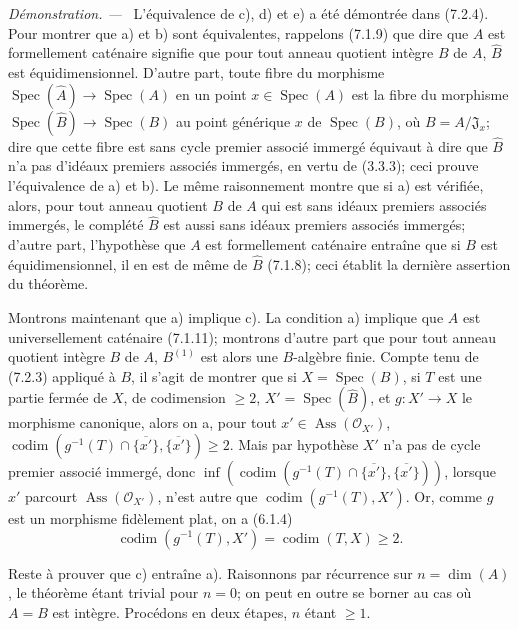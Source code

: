 \documentclass[10pt,oneside]{book}
\newcommand{\oldpage}[2][]{%
  \setcounter{footnote}{0}%
  \marginpar{\scriptsize\textbf{#1}~|~#2}\ignorespaces}
\newenvironment{proof}{%
  \par\medskip\noindent\textit{Démonstration. ---\ }}{\par}
\begin{document}
\begin{proof}
L'équivalence de c), d) et e) a été démontrée dans (7.2.4). Pour montrer
que a) et b) sont équivalentes, rappelons (7.1.9) que dire que $A$ est
formellement caténaire signifie que pour tout anneau quotient intègre $B$
de $A$, $\widehat B$ est équidimensionnel. D'autre part, toute fibre du
morphisme $\operatorname{Spec}(\widehat A)\to\operatorname{Spec}(A)$ en un
point $x\in\operatorname{Spec}(A)$ est la fibre du morphisme
$\operatorname{Spec}(\widehat B)\to\operatorname{Spec}(B)$ au point
générique $x$ de $\operatorname{Spec}(B)$, où
$B=A/\mathfrak J_x$; dire que cette fibre est sans cycle premier associé
immergé équivaut à dire que $\widehat B$ n'a pas d'idéaux premiers associés
immergés, en vertu de (3.3.3); ceci prouve l'équivalence de a) et b). Le
même raisonnement montre que si a) est vérifiée, alors, pour tout anneau
quotient $B$ de $A$ qui est sans idéaux premiers associés immergés, le
complété $\widehat B$ est aussi sans idéaux premiers associés immergés;
d'autre part, l'hypothèse que $A$ est formellement caténaire entraîne que
si $B$ est équidimensionnel, il en est de même de $\widehat B$ (7.1.8);
ceci établit la dernière assertion du théorème.

Montrons maintenant que a) implique c). La condition a) implique que $A$
est universellement caténaire (7.1.11); montrons d'autre part que pour tout
anneau quotient intègre $B$ de $A$, $B^{(1)}$ est alors une $B$-algèbre
finie. Compte tenu de (7.2.3) appliqué à $B$, il s'agit de montrer que si
$X=\operatorname{Spec}(B)$, si $T$ est une partie fermée de $X$, de
codimension $\geqslant2$, $X'=\operatorname{Spec}(\widehat B)$, et
$g:X'\to X$ le morphisme canonique, alors on a, pour tout
$x'\in\operatorname{Ass}(\mathscr O_{X'})$,
$\operatorname{codim}(g^{-1}(T)\cap\overline{\{x'\}},
\overline{\{x'\}})\geqslant2$.
Mais par hypothèse $X'$ n'a pas de cycle premier associé immergé, donc
$\inf(\operatorname{codim}(g^{-1}(T)\cap\overline{\{x'\}},
\overline{\{x'\}}))$, lorsque $x'$ parcourt
$\operatorname{Ass}(\mathscr O_{X'})$, n'est autre que
$\operatorname{codim}(g^{-1}(T),X')$.
Or, comme $g$ est un morphisme fidèlement plat, on a (6.1.4)
\[
\operatorname{codim}(g^{-1}(T),X')=\operatorname{codim}(T,X)\geqslant2.
\]

\oldpage[IV-2]{191}

Reste à prouver que c) entraîne a). Raisonnons par récurrence sur
$n=\dim(A)$, le théorème étant trivial pour $n=0$; on peut en outre se
borner au cas où $A=B$ est intègre. Procédons en deux étapes, $n$ étant
$\geqslant1$.


\end{proof}
\end{document}

